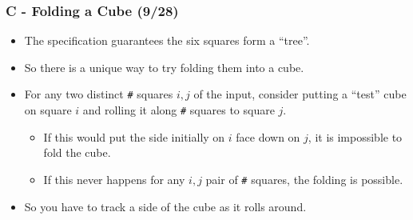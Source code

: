 \documentclass{beamer}
\begin{document}
\begin{frame}
\frametitle{C - Folding a Cube (9/28)}
\begin{itemize}
\setlength\itemsep{0.3\baselineskip}
\item The specification guarantees the six squares form a ``tree''.
\item So there is a unique way to try folding them into a cube.
\item For any two distinct \texttt{\#} squares $i,j$ of the input, consider putting a ``test'' cube on square $i$ and rolling it along \texttt{\#} squares to square $j$.
\begin{itemize}
\item If this would put the side initially on $i$ face down on $j$, it is impossible to fold the cube.
\item If this never happens for any $i,j$ pair of \texttt{\#} squares, the folding is possible.
\end{itemize}
\item So you have to track a side of the cube as it rolls around.
\end{itemize}
\end{frame}
\end{document}
